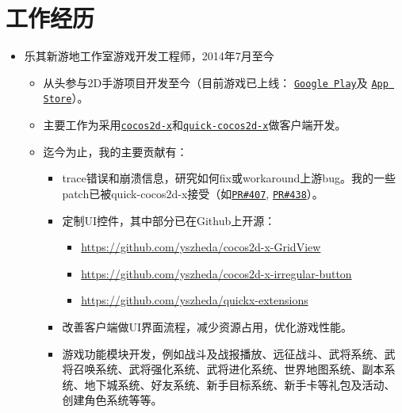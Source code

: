 \documentclass[letterpaper]{article}
\begin{document}

\section*{工作经历}
\begin{itemize}
    \item 乐其新游地工作室游戏开发工程师，2014年7月至今
        \begin{itemize}
            \item 从头参与2D手游项目开发至今（目前游戏已上线：
                \href{https://play.google.com/store/apps/details?id=com.game168.yysg}{\tt Google Play}及
                \href{https://itunes.apple.com/us/app/ye-ye-san-guo/id976517523?mt=8}{\tt App Store}）。
            \item 主要工作为采用\href{http://cocos2d-x.org/}{\tt cocos2d-x}和\href{https://github.com/dualface/v3quick}{\tt quick-cocos2d-x}做客户端开发。
            \item 迄今为止，我的主要贡献有：
                \begin{itemize}
                    \item trace错误和崩溃信息，研究如何fix或workaround上游bug。我的一些patch已被quick-cocos2d-x接受（如\href{https://github.com/dualface/v3quick/pull/407}{\tt PR\#407}, \href{https://github.com/dualface/v3quick/pull/438}{\tt PR\#438}）。
                    \item 定制UI控件，其中部分已在Github上开源：
                        \begin{itemize}
                            \item \url{https://github.com/yszheda/cocos2d-x-GridView}
                            \item \url{https://github.com/yszheda/cocos2d-x-irregular-button}
                            \item \url{https://github.com/yszheda/quickx-extensions}
                        \end{itemize}
                    \item 改善客户端做UI界面流程，减少资源占用，优化游戏性能。
                    \item 游戏功能模块开发，例如战斗及战报播放、远征战斗、武将系统、武将召唤系统、武将强化系统、武将进化系统、世界地图系统、副本系统、地下城系统、好友系统、新手目标系统、新手卡等礼包及活动、创建角色系统等等。
                \end{itemize}
        \end{itemize}
\end{itemize}
\end{document}
